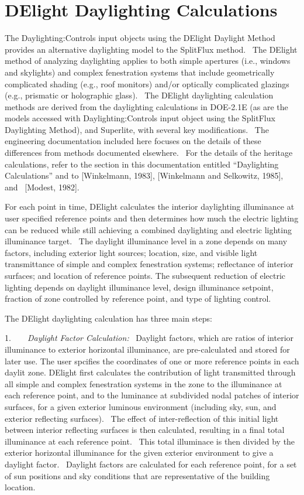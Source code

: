 \section{DElight Daylighting Calculations}\label{delight-daylighting-calculations}

The Daylighting:Controls input objects using the DElight Daylight Method provides an alternative daylighting model to the SplitFlux method.~ The DElight method of analyzing daylighting applies to both simple apertures (i.e., windows and skylights) and complex fenestration systems that include geometrically complicated shading (e.g., roof monitors) and/or optically complicated glazings (e.g., prismatic or holographic glass).~ The DElight daylighting calculation methods are derived from the daylighting calculations in DOE-2.1E (as are the models accessed with Daylighting:Controls input object using the SplitFlux Daylighting Method), and Superlite, with several key modifications.~ The engineering documentation included here focuses on the details of these differences from methods documented elsewhere.~ For the details of the heritage calculations, refer to the section in this documentation entitled ``Daylighting Calculations'' and to {[}Winkelmann, 1983{]}, {[}Winkelmann and Selkowitz, 1985{]}, and~ {[}Modest, 1982{]}.

For each point in time, DElight calculates the interior daylighting illuminance at user specified reference points and then determines how much the electric lighting can be reduced while still achieving a combined daylighting and electric lighting illuminance target.~ The daylight illuminance level in a zone depends on many factors, including exterior light sources; location, size, and visible light transmittance of simple and complex fenestration systems; reflectance of interior surfaces; and location of reference points. The subsequent reduction of electric lighting depends on daylight illuminance level, design illuminance setpoint, fraction of zone controlled by reference point, and type of lighting control.

The DElight daylighting calculation has three main steps:

1.~~~~\emph{Daylight Factor Calculation:}~ Daylight factors, which are ratios of interior illuminance to exterior horizontal illuminance, are pre-calculated and stored for later use. The user spcifies the coordinates of one or more reference points in each daylit zone. DElight first calculates the contribution of light transmitted through all simple and complex fenestration systems in the zone to the illuminance at each reference point, and to the luminance at subdivided nodal patches of interior surfaces, for a given exterior luminous environment (including sky, sun, and exterior reflecting surfaces).~ The effect of inter-reflection of this initial light between interior reflecting surfaces is then calculated, resulting in a final total illuminance at each reference point.~ This total illuminace is then divided by the exterior horizontal illuminance for the given exterior environment to give a daylight factor.~ Daylight factors are calculated for each reference point, for a set of sun positions and sky conditions that are representative of the building location.

